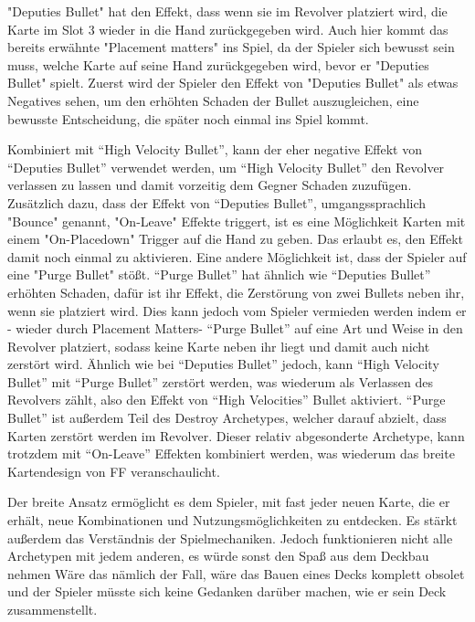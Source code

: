 "Deputies Bullet" hat den Effekt, dass wenn sie im Revolver platziert wird, die Karte im Slot 3 wieder in die Hand
zurückgegeben wird. Auch hier kommt das bereits erwähnte "Placement matters" ins Spiel, da der Spieler sich bewusst sein
muss, welche Karte auf seine Hand zurückgegeben wird, bevor er "Deputies Bullet" spielt. Zuerst wird der Spieler den
Effekt von "Deputies Bullet" als etwas Negatives sehen, um den erhöhten Schaden der Bullet auszugleichen,
eine bewusste Entscheidung, die später noch einmal ins Spiel kommt.


Kombiniert mit “High Velocity Bullet”, kann der eher negative Effekt von “Deputies Bullet” verwendet werden, um
“High Velocity Bullet” den Revolver verlassen zu lassen und damit vorzeitig dem Gegner Schaden zuzufügen.
Zusätzlich dazu, dass der Effekt von “Deputies Bullet”, umgangssprachlich "Bounce" genannt, "On-Leave" Effekte triggert,
ist es eine Möglichkeit Karten mit einem "On-Placedown" Trigger auf die Hand zu geben. Das erlaubt es, den Effekt damit noch einmal zu aktivieren.
Eine andere Möglichkeit ist, dass der Spieler auf eine "Purge Bullet" stößt. “Purge Bullet” hat ähnlich wie “Deputies Bullet”
erhöhten Schaden, dafür ist ihr Effekt, die Zerstörung von zwei Bullets neben ihr, wenn sie platziert wird.
Dies kann jedoch vom Spieler vermieden werden indem er - wieder durch Placement Matters- “Purge Bullet” auf eine Art und
Weise in den Revolver platziert, sodass keine Karte neben ihr liegt und damit auch nicht zerstört wird.
Ähnlich wie bei “Deputies Bullet” jedoch, kann “High Velocity Bullet” mit “Purge Bullet” zerstört werden, was wiederum als
Verlassen des Revolvers zählt, also den Effekt von “High Velocities” Bullet aktiviert. “Purge Bullet” ist außerdem Teil
des Destroy Archetypes, welcher darauf abzielt, dass Karten zerstört werden im Revolver.
Dieser relativ abgesonderte Archetype, kann trotzdem mit “On-Leave” Effekten kombiniert werden, was wiederum das breite
Kartendesign von FF veranschaulicht. %


Der breite Ansatz ermöglicht es dem Spieler, mit fast jeder neuen Karte, die er erhält, neue Kombinationen und Nutzungsmöglichkeiten zu entdecken.
Es stärkt außerdem das Verständnis der Spielmechaniken.
Jedoch funktionieren nicht alle \FF Archetypen mit jedem anderen, es würde sonst den Spaß aus dem Deckbau nehmen
Wäre das nämlich der Fall, wäre das Bauen eines Decks komplett obsolet und der Spieler müsste sich keine Gedanken darüber machen, wie er sein Deck zusammenstellt.




